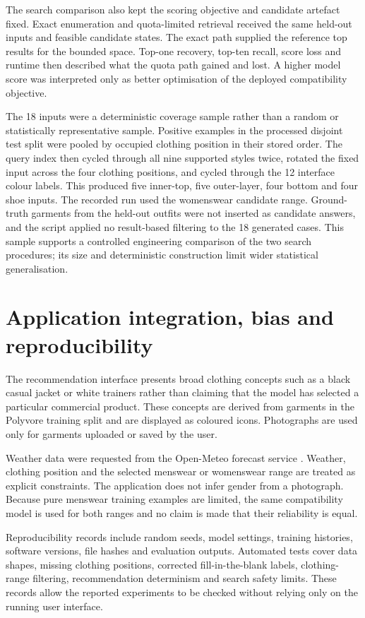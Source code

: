 The search comparison also kept the scoring objective and candidate artefact
fixed. Exact enumeration and quota-limited retrieval received the same held-out
inputs and feasible candidate states. The exact path supplied the reference
top results for the bounded space. Top-one recovery, top-ten recall, score loss
and runtime then described what the quota path gained and lost. A higher model
score was interpreted only as better optimisation of the deployed
compatibility objective.

The 18 inputs were a deterministic coverage sample rather than a random or
statistically representative sample. Positive examples in the processed
disjoint test split were pooled by occupied clothing position in their stored
order. The query index then cycled through all nine supported styles twice,
rotated the fixed input across the four clothing positions, and cycled through
the 12 interface colour labels. This produced five inner-top, five outer-layer,
four bottom and four shoe inputs. The recorded run used the womenswear candidate
range. Ground-truth garments from the held-out outfits were not inserted as
candidate answers, and the script applied no result-based filtering to the 18
generated cases. This sample supports a controlled engineering comparison of
the two search procedures; its size and deterministic construction limit wider
statistical generalisation.

\section{Application integration, bias and reproducibility}

The recommendation interface presents broad clothing concepts such as a black
casual jacket or white trainers rather than claiming that the model has
selected a particular commercial product. These concepts are derived from
garments in the Polyvore training split and are displayed as coloured icons.
Photographs are used only for garments uploaded or saved by the user.

Weather data were requested from the Open-Meteo forecast service
\parencite{openmeteo2026}. Weather, clothing position and the selected menswear
or womenswear range are treated as explicit constraints. The application does not infer gender from a
photograph. Because pure menswear training examples are limited, the same
compatibility model is used for both ranges and no claim is made that their
reliability is equal.

Reproducibility records include random seeds, model settings, training
histories, software versions, file hashes and evaluation outputs. Automated
tests cover data shapes, missing clothing positions, corrected fill-in-the-blank
labels, clothing-range filtering, recommendation determinism and search safety
limits. These records allow the reported experiments to be checked without
relying only on the running user interface.

